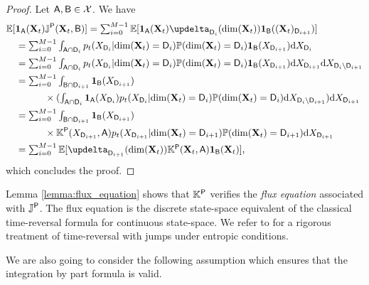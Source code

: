 \begin{proof}
  Let $\mathsf{A}, \mathsf{B} \in \mathcal{X}$. We have
  \begin{align}
    &\expeLigne{\mathbf{1}_{\msa}(\bfX_t) \Jbb^\msp(\bfX_t, \msb)} = \textstyle \sum_{i=0}^{M-1} \expeLigne{\mathbf{1}_{\msa}(\bfX_t) \updelta_{\msd_i}(\dim(\bfX_t)) \mathbf{1}_{\msb}((\bfX_t)_{\msd_{i+1}})}\\
                                                                  &\quad = \textstyle \sum_{i=0}^{M-1} \int_{\msa \cap \msd_i}  p_t(X_{\msd_i}|\dim(\bfX_t) = \msd_i) \Pbb(\dim(\bfX_t)=\msd_i) \mathbf{1}_{\msb}(X_{\msd_{i+1}})  \rmd X_{\msd_i} \\ 
    &\quad = \textstyle \sum_{i=0}^{M-1} \int_{\msa \cap \msd_i} p_t(X_{\msd_i}|\dim(\bfX_t) = \msd_i)\Pbb(\dim(\bfX_t)=\msd_i)  \mathbf{1}_{\msb}(X_{\msd_{i+1}}) \rmd X_{\msd_{i+1}} \rmd X_{\msd_i \backslash \msd_{i+1}}    \\
    &\quad = \textstyle \sum_{i=0}^{M-1} \int_{\msb \cap \msd_{i+1}}  \mathbf{1}_{\msb}(X_{\msd_{i+1}})\\
    & \qquad \qquad \textstyle \times  (\int_{\msa \cap \msd_i} \mathbf{1}_{\msa}(X_{\msd_i}) p_t(X_{\msd_i}|\dim(\bfX_t) = \msd_i)  \Pbb(\dim(\bfX_t)=\msd_i) \rmd X_{\msd_i \backslash \msd_{i+1}} )  \rmd X_{\msd_{i+1}} \\
    &\quad = \textstyle \sum_{i=0}^{M-1} \int_{\msb \cap \msd_{i+1}} \mathbf{1}_{\msb}(X_{\msd_{i+1}}) \\
    & \qquad \qquad \times \Kbb^\msp(X_{\msd_{i+1}}, \msa) p_t(X_{\msd_{i+1}}|\dim(\bfX_t) = \msd_{i+1}) \Pbb(\dim(\bfX_t) = \msd_{i+1})  \rmd X_{\msd_{i+1}} \\
    &\quad = \textstyle \sum_{i=0}^{M-1} \expeLigne{\updelta_{\msd_{i+1}}(\dim(\bfX_t)) \Kbb^\msp(\bfX_t, \msa) \mathbf{1}_{\msb}(\bfX_t)} ,
  \end{align}
  which concludes the proof.
\end{proof}

Lemma \ref{lemma:flux_equation} shows that $\mathbb{K}^{\mathsf{P}}$ verifies the \emph{flux
  equation} associated with $\mathbb{J}^{\mathsf{P}}$. The flux equation is the discrete
state-space equivalent of the classical time-reversal formula for continuous
state-space. We refer to \cite{conforti2022time} for a rigorous treatment of
time-reversal with jumps under entropic conditions. 

We are also going to consider the following assumption which ensures that the
integration by part formula is valid.

